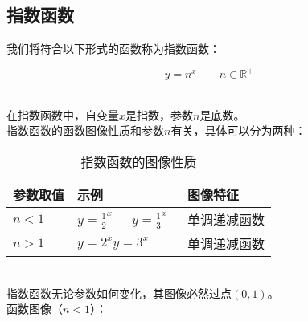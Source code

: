 \documentclass[UTF8]{ctexart}
\begin{document}
\subsection{指数函数}
    我们将符合以下形式的函数称为指数函数：
    \begin{large}
        \begin{equation*}
            y=n^x\qquad n\in\mathbb{R^+}
        \end{equation*}
    \end{large}\\
    在指数函数中，自变量$x$是指数，参数$n$是底数。\\[3mm]
    指数函数的函数图像性质和参数$n$有关，具体可以分为两种：\vspace{5pt}
    \begin{table}[h]
        \begin{center}
            \begin{tabular}{l|l|l}
                \hline
                参数取值&示例&图像特征\\ \hline
                $n<1$\qquad\qquad&$y=\frac{1}{2}^x$\quad~~~$y=\frac{1}{3}^x$&单调递减函数\qquad\qquad\\ \hline
                $n>1$\qquad\qquad&$y=2^x$\qquad$y=3^x\qquad$&单调递减函数\\ \hline
            \end{tabular}
            \caption{指数函数的图像性质}
        \end{center}
    \end{table}\\
    指数函数无论参数如何变化，其图像必然过点$(0,1)$。\\[3mm]
    函数图像（$n<1$）：\vspace{-5pt}
\end{document}
